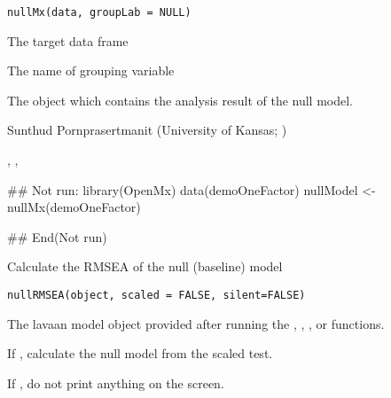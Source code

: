 \documentclass[a4paper]{book}
\begin{document}
%
\begin{Usage}
\begin{verbatim}
nullMx(data, groupLab = NULL)
\end{verbatim}
\end{Usage}
%
\begin{Arguments}
\begin{ldescription}
\item[\code{data}] 
The target data frame

\item[\code{groupLab}] 
The name of grouping variable

\end{ldescription}
\end{Arguments}
%
\begin{Value}
The  object which contains the analysis result of the null model.
\end{Value}
%
\begin{Author}\relax
Sunthud Pornprasertmanit (University of Kansas; )
\end{Author}
%
\begin{SeeAlso}\relax
{}, , 
\end{SeeAlso}
%
\begin{Examples}
\begin{ExampleCode}
## Not run: 
library(OpenMx)
data(demoOneFactor)
nullModel <- nullMx(demoOneFactor)

## End(Not run)
\end{ExampleCode}
\end{Examples}
%
\begin{Description}\relax
Calculate the RMSEA of the null (baseline) model
\end{Description}
%
\begin{Usage}
\begin{verbatim}
nullRMSEA(object, scaled = FALSE, silent=FALSE)
\end{verbatim}
\end{Usage}
%
\begin{Arguments}
\begin{ldescription}
\item[\code{object}] The lavaan model object provided after running the , , , or  functions.
\item[\code{scaled}] If , calculate the null model from the scaled test.
\item[\code{silent}] If , do not print anything on the screen.
\end{ldescription}
\end{Arguments}
\end{document}

